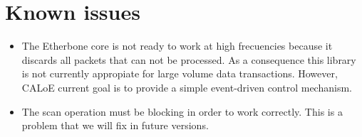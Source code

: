 \section{Known issues}

\begin{itemize}
 \item {The Etherbone core is not ready to work at high frecuencies because it discards all packets that can not be processed.
 As a consequence this library is not currently appropiate for large volume data transactions. However, CALoE current goal is to provide a simple event-driven control mechanism.}
 \item {The scan operation must be blocking in order to work correctly. This is a problem that we will fix in future versions.}
\end{itemize}
